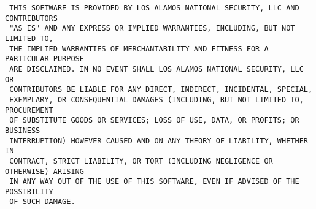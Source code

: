\begin{verbatim}
 THIS SOFTWARE IS PROVIDED BY LOS ALAMOS NATIONAL SECURITY, LLC AND CONTRIBUTORS
 "AS IS" AND ANY EXPRESS OR IMPLIED WARRANTIES, INCLUDING, BUT NOT LIMITED TO,
 THE IMPLIED WARRANTIES OF MERCHANTABILITY AND FITNESS FOR A PARTICULAR PURPOSE
 ARE DISCLAIMED. IN NO EVENT SHALL LOS ALAMOS NATIONAL SECURITY, LLC OR
 CONTRIBUTORS BE LIABLE FOR ANY DIRECT, INDIRECT, INCIDENTAL, SPECIAL,
 EXEMPLARY, OR CONSEQUENTIAL DAMAGES (INCLUDING, BUT NOT LIMITED TO, PROCUREMENT
 OF SUBSTITUTE GOODS OR SERVICES; LOSS OF USE, DATA, OR PROFITS; OR BUSINESS
 INTERRUPTION) HOWEVER CAUSED AND ON ANY THEORY OF LIABILITY, WHETHER IN
 CONTRACT, STRICT LIABILITY, OR TORT (INCLUDING NEGLIGENCE OR OTHERWISE) ARISING
 IN ANY WAY OUT OF THE USE OF THIS SOFTWARE, EVEN IF ADVISED OF THE POSSIBILITY
 OF SUCH DAMAGE.
 
 \end{verbatim}